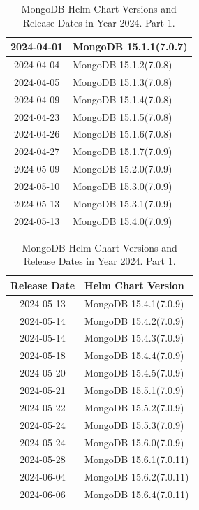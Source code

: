\documentclass[../main.tex]{subfiles}
\begin{document}
\begin{table}[h]
\begin{minipage}{0.45\textwidth}
\begin{tabular}{|c|l|}
    2024-04-01 & MongoDB 15.1.1(7.0.7) \\ \hline  
    2024-04-04 & MongoDB 15.1.2(7.0.8) \\ \hline  
    2024-04-05 & MongoDB 15.1.3(7.0.8) \\ \hline  
    2024-04-09 & MongoDB 15.1.4(7.0.8) \\ \hline  
    2024-04-23 & MongoDB 15.1.5(7.0.8) \\ \hline  
    2024-04-26 & MongoDB 15.1.6(7.0.8) \\ \hline  
    2024-04-27 & MongoDB 15.1.7(7.0.9) \\ \hline
    2024-05-09 & MongoDB 15.2.0(7.0.9) \\ \hline  
    2024-05-10 & MongoDB 15.3.0(7.0.9) \\ \hline  
    2024-05-13 & MongoDB 15.3.1(7.0.9) \\ \hline  
    2024-05-13 & MongoDB 15.4.0(7.0.9) \\ \hline
\end{tabular}
\caption{MongoDB Helm Chart Versions and Release Dates in Year 2024. Part 1.}
\end{minipage}
\hspace{1cm} %
\begin{minipage}{0.45\textwidth}
\centering
\begin{tabular}{|c|l|}
\hline
\textbf{Release Date} & \textbf{Helm Chart Version} \\ \hline
    2024-05-13 & MongoDB 15.4.1(7.0.9) \\ \hline
    2024-05-14 & MongoDB 15.4.2(7.0.9) \\ \hline
    2024-05-14 & MongoDB 15.4.3(7.0.9) \\ \hline
    2024-05-18 & MongoDB 15.4.4(7.0.9) \\ \hline 
    2024-05-20 & MongoDB 15.4.5(7.0.9) \\ \hline  
    2024-05-21 & MongoDB 15.5.1(7.0.9) \\ \hline  
    2024-05-22 & MongoDB 15.5.2(7.0.9) \\ \hline  
    2024-05-24 & MongoDB 15.5.3(7.0.9) \\ \hline  
    2024-05-24 & MongoDB 15.6.0(7.0.9) \\ \hline  
    2024-05-28 & MongoDB 15.6.1(7.0.11) \\ \hline
    2024-06-04 & MongoDB 15.6.2(7.0.11) \\ \hline  
    2024-06-06 & MongoDB 15.6.4(7.0.11) \\ \hline  

\end{tabular}
\end{minipage}
\end{table}
\end{document}

